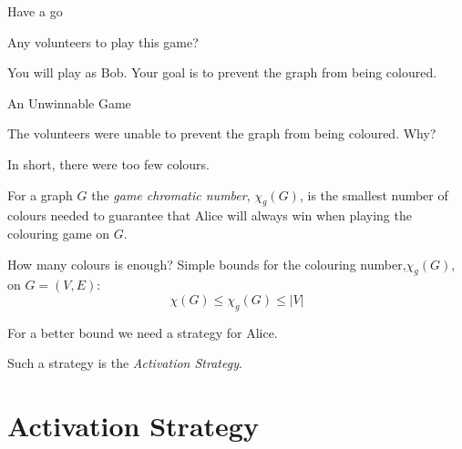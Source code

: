 \documentclass[handout]{beamer}
\begin{document}
\begin{frame}{\secname}{Have a go}
    
    
    Any volunteers to play this game?
    
    \bigskip
    
    You will play as Bob. Your goal is to prevent the graph from being coloured.
    
\end{frame}


\begin{frame}{\secname}{An Unwinnable Game}
    
    
    The volunteers were unable to prevent the graph from being coloured. Why?
    
    \bigskip
    
    In short, there were too few colours.
    
    
    \bigskip
    \pause
    
    \begin{definition}
        For a graph $G$ the \textit{game chromatic number}, $\chi_g(G)$, is the smallest number of colours needed to guarantee that Alice will always win when playing the colouring game on $G$.
    \end{definition}
   
\end{frame}

\begin{frame}{\secname}{How many colours is enough?}
    Simple bounds for the colouring number,$\chi_g(G)$, on $G=(V,E)$:
    \[\chi(G) \leq \chi_g(G) \leq |V|\]
    
    \bigskip
    
    For a better bound we need a strategy for Alice.
    
    \bigskip
    \pause
    
    Such a strategy is the \textit{Activation Strategy}.
\end{frame}


\section{Activation Strategy}
\end{document}
